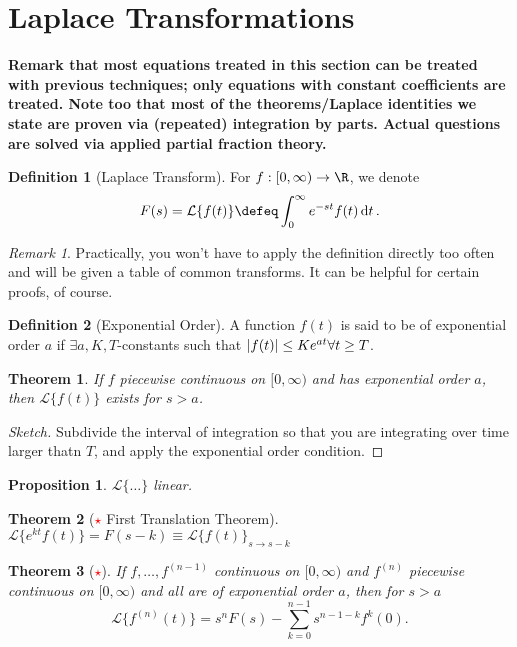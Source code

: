 \documentclass[12pt, oneside]{article}
\newcommand{\laplace}[1]{\mathcal{L}\{#1\}}
\theoremstyle{definition}
\newtheorem{defn}{Definition}
\theoremstyle{plain}
\newtheorem{thm}{Theorem}
\newtheorem{prop}{Proposition}
\theoremstyle{remark}
\newtheorem{remark}{Remark}
\let\origsection=\section
\renewcommand\section[1]{\origsection{#1}\label{sec:\thesection}}
\begin{document}
\section{Laplace Transformations}

\textbf{Remark that most equations treated in this section can be treated with previous techniques; only equations with constant coefficients are treated.
Note too that most of the theorems/Laplace identities we state are proven via (repeated) integration by parts. Actual questions are solved via applied partial fraction theory.
}

\begin{defn}[Laplace Transform]
  For $f : [0, \infty) \to \R$, we denote \[
  F(s) = \laplace{f(t)}   \defeq \int_{0}^\infty e^{-st} f(t) \dd{t}.
  \]
\end{defn}
\begin{remark}
  Practically, you won't have to apply the definition directly too often and will be given a table of common transforms. It can be helpful for certain proofs, of course.
\end{remark}
\begin{defn}[Exponential Order]
  A function $f(t)$ is said to be of exponential order $a$ if $\exists a, K, T$-constants such that $\abs{f(t)} \leq Ke^{at} \forall t \geq T$.
\end{defn}

\begin{thm}
If $f$ piecewise continuous on $[0, \infty)$ and has exponential order $a$, then $\laplace{f(t)}$ exists for $s > a$.
\end{thm}
\begin{proof}[Sketch]
Subdivide the interval of integration so that you are integrating over time larger thatn $T$, and apply the exponential order condition. 
\end{proof}

\begin{prop}
  $\laplace{\dots}$ linear.
\end{prop}

\begin{thm}[\textcolor{red}{$\star$} First Translation Theorem]
  $\laplace{e^{kt} f(t)} = F(s - k) \equiv \laplace{f(t)}_{s \to s- k}$
\end{thm}

\begin{thm}[\textcolor{red}{$\star$}]
  If $f, \dots, f^{(n-1)}$ continuous on $[0, \infty)$ and $f^{(n)}$ piecewise continuous on $[0, \infty)$ and all are of exponential order $a$, then for $s > a$ \[
  \laplace{f^{(n)}(t)} = s^{n} F(s) - \sum_{k=0}^{n-1} s^{n-1-k}f^{k}(0).
  \]
\end{thm}
\end{document}
